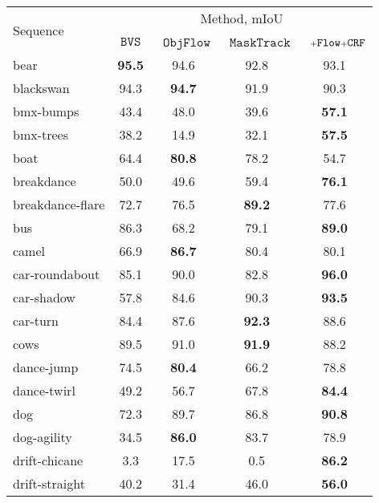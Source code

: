 \documentclass[10pt,twocolumn,letterpaper]{article}
\begin{document}
\begin{table}
\begin{centering}
\begingroup
\begin{tabular}{l|@{   }c@{   }c@{   }c@{   }c@{    }}
\multirow{2}{*}{Sequence} & \multicolumn{4}{c}{Method, mIoU}\\
& $\mathtt{BVS}$ \cite{Maerki2016Cvpr} & \ $\mathtt{ObjFlow}$\cite{Tsai2016Cvpr} & \ $\mathtt{MaskTrack}$ & \  $\mathtt{\mathsmaller{+}Flow\mathsmaller{+}CRF}$ \tabularnewline
\hline
\hline
bear                & \bf 95.5    &     94.6    &     92.8  &		93.1 \\
blackswan           &     94.3    & \bf 94.7    &     91.9  &		90.3 \\
bmx-bumps           &     43.4    &     48.0    &     39.6  & \bf 57.1 \\
bmx-trees           & 38.2    &     14.9    &     32.1  &	\bf 	57.5 \\
boat                &     64.4    & \bf 80.8    &     78.2  &		54.7 \\
breakdance          &     50.0    &     49.6    &  59.4  &	\bf 	76.1 \\
breakdance-flare    &     72.7    &     76.5    & \bf 89.2  &		77.6 \\
bus                 &  86.3    &     68.2    &     79.1  &	\bf 	89.0 \\
camel               &     66.9    & \bf 86.7    &     80.4  &		80.1 \\
car-roundabout      &     85.1    &  90.0    &     82.8  &	\bf 	96.0 \\
car-shadow          &     57.8    &     84.6    &  90.3  &	\bf 	93.5 \\
car-turn            &     84.4    &     87.6    & \bf 92.3  &		88.6 \\
cows                &     89.5    &     91.0    & \bf 91.9  &		88.2 \\
dance-jump          &     74.5    & \bf 80.4    &     66.2  &		78.8 \\
dance-twirl         &     49.2    &     56.7    &  67.8  &	\bf 	84.4 \\
dog                 &     72.3    & 89.7    &     86.8  &	\bf 	90.8 \\
dog-agility         &     34.5    & \bf 86.0    &     83.7  &		78.9 \\
drift-chicane       &     3.3     &  17.5    &     0.5   &	\bf 	86.2 \\
drift-straight      &     40.2    &     31.4    &  46.0  &	\bf 	56.0 \\

\end{tabular}
\end{centering}
\end{table}
\end{document}
